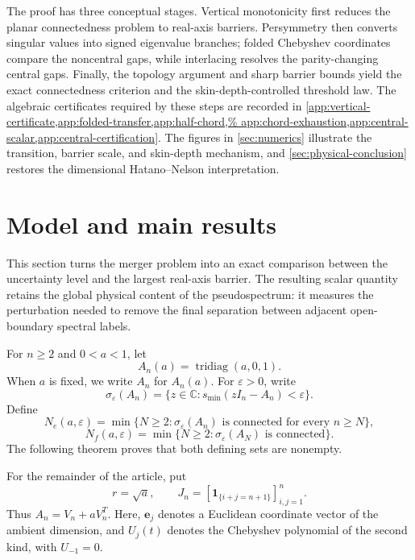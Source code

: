 \documentclass[12pt,anonymous]{iopjournal}
\numberwithin{equation}{section}
\theoremstyle{remark}
\DeclareMathOperator{\tridiag}{tridiag}
\newcommand{\C}{\mathbb C}
\begin{document}
The proof has three conceptual stages.  Vertical monotonicity first reduces
the planar connectedness problem to real-axis barriers.  Persymmetry then
converts singular values into signed eigenvalue branches; folded Chebyshev
coordinates compare the noncentral gaps, while interlacing resolves the
parity-changing central gaps.  Finally, the topology argument and sharp
barrier bounds yield the exact connectedness criterion and the
skin-depth-controlled threshold law.  The algebraic certificates required
by these steps are recorded in
\cref{app:vertical-certificate,app:folded-transfer,app:half-chord,%
app:chord-exhaustion,app:central-scalar,app:central-certification}.
The figures in \cref{sec:numerics} illustrate the transition, barrier scale,
and skin-depth mechanism, and \cref{sec:physical-conclusion} restores the
dimensional Hatano--Nelson interpretation.

\section{Model and main results}\label{sec:main-results}

This section turns the merger problem into an exact comparison between the
uncertainty level and the largest real-axis barrier.  The resulting scalar
quantity retains the global physical content of the pseudospectrum: it
measures the perturbation needed to remove the final separation between
adjacent open-boundary spectral labels.

For $n\geq2$ and $0<a<1$, let
\[
 A_n(a)=\tridiag(a,0,1).
\]
When \(a\) is fixed, we write \(A_n\) for \(A_n(a)\).
For $\varepsilon>0$, write
\[
 \sigma_\varepsilon(A_n)=
 \{z\in\C:s_{\min}(zI_n-A_n)<\varepsilon\}.
\]
Define
\[
 N_e(a,\varepsilon)=\min\{N\geq2:
 \sigma_\varepsilon(A_n)\text{ is connected for every }n\geq N\},
\]
\[
 N_f(a,\varepsilon)=\min\{N\geq2:
 \sigma_\varepsilon(A_N)\text{ is connected}\}.
\]
The following theorem proves that both defining sets are nonempty.

For the remainder of the article, put
\[
 r=\sqrt a,\qquad
 J_n=[\boldsymbol 1_{\{i+j=n+1\}}]_{i,j=1}^n.
\]
Thus \(A_n=V_n+aV_n^T\).  Here, \(\mathbf e_j\) denotes a Euclidean
coordinate vector of the ambient dimension, and \(U_j(t)\) denotes the
Chebyshev polynomial of the second kind, with \(U_{-1}=0\).
\end{document}
